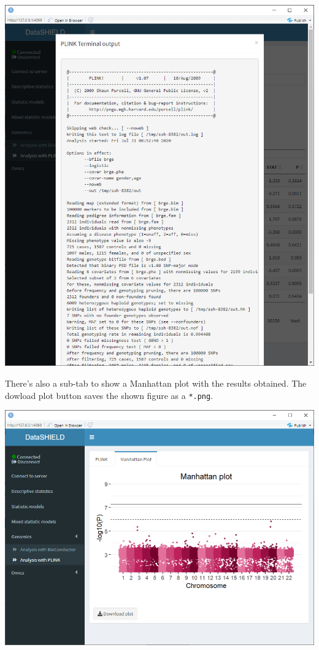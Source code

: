 \documentclass[
]{book}
\begin{document}
\includegraphics{images/genomics4.png}

There's also a sub-tab to show a Manhattan plot with the results obtained. The dowload plot button saves the shown figure as a \texttt{*.png}.

\includegraphics{images/genomics5.png}
\end{document}
